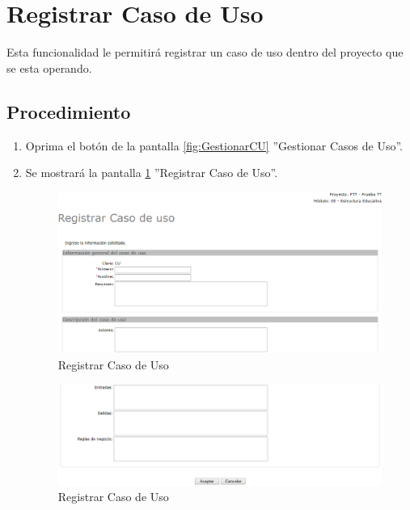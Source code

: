
\hypertarget{cv:registrarCU}{\section{Registrar Caso de Uso}} \label{sec:registrarCU}

	Esta funcionalidad le permitirá registrar un caso de uso dentro del proyecto que se esta operando.

		\subsection{Procedimiento}

			\begin{enumerate}
	
			\item Oprima el botón \IURegistrar{} de la pantalla \ref{fig:GestionarCU} ''Gestionar Casos de Uso''.
			
			\item Se mostrará la pantalla \ref{fig:registrarCUA} ''Registrar Caso de Uso''.

			\begin{figure}[H]
				\begin{center}
					\includegraphics[scale=0.5]{roles/lider/casosUso/pantallas/IU12-1registrarCUA}
					\caption{Registrar Caso de Uso}
					\label{fig:registrarCUA}
				\end{center}
			\end{figure}
		
		\begin{figure}[H]
			\begin{center}
				\includegraphics[scale=0.5]{roles/lider/casosUso/pantallas/IU12-1registrarCUB}
				\caption{Registrar Caso de Uso}
				\label{fig:registrarCUB}
			\end{center}
		\end{figure}
		

\end{enumerate}
